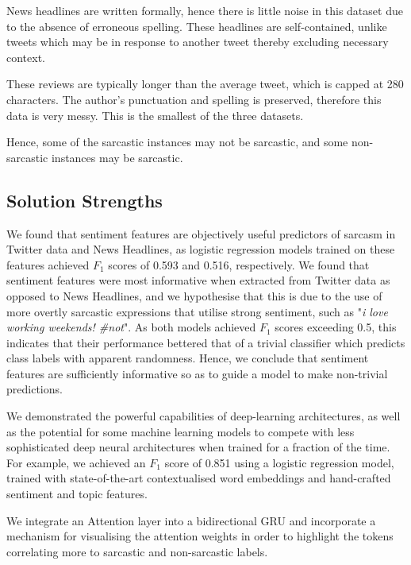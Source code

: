\documentclass[12pt,a4paper]{article}
\begin{document}
News headlines are written formally, hence there is little noise in this dataset due to the absence of erroneous spelling. These headlines are self-contained, unlike tweets which may be in response to another tweet thereby excluding necessary context.

These reviews are typically longer than the average tweet, which is capped at 280 characters. The author's punctuation and spelling is preserved, therefore this data is very messy. This is the smallest of the three datasets. 

Hence, some of the sarcastic instances may not be sarcastic, and some non-sarcastic instances may be sarcastic.

\subsection{Solution Strengths}\vspace{-10pt}
\noindent We found that sentiment features are objectively useful predictors of sarcasm in Twitter data and News Headlines, as logistic regression models trained on these features achieved $F_1$ scores of 0.593 and 0.516, respectively. We found that sentiment features were most informative when extracted from Twitter data as opposed to News Headlines, and we hypothesise that this is due to the use of more overtly sarcastic expressions that utilise strong sentiment, such as "\textit{i love working weekends! \#not}". As both models achieved $F_1$ scores exceeding 0.5, this indicates that their performance bettered that of a trivial classifier which predicts class labels with apparent randomness. Hence, we conclude that sentiment features are sufficiently informative so as to guide a model to make non-trivial predictions.

We demonstrated the powerful capabilities of deep-learning architectures, as well as the potential for some machine learning models to compete with less sophisticated deep neural architectures when trained for a fraction of the time. For example, we achieved an $F_1$ score of 0.851 using a logistic regression model, trained with state-of-the-art contextualised word embeddings and hand-crafted sentiment and topic features.

We integrate an Attention layer into a bidirectional GRU and incorporate a mechanism for visualising the attention weights in order to highlight the tokens correlating more to sarcastic and non-sarcastic labels.\\

\end{document}
